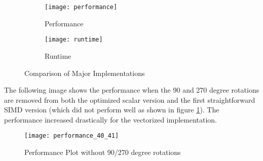 \begin{figure}[H]
  \begin{subfigure}[t]{\linewidth}
    \centering
    \texttt{[image: performance]}
    \caption{Performance}
    \label{fig:perf}
  \end{subfigure}
  \begin{subfigure}[t]{\linewidth}
    \centering
    \texttt{[image: runtime]}
    \caption{Runtime}
    \label{fig:runtime}
  \end{subfigure}
  \caption{Comparison of Major Implementations}
\end{figure}

The following image shows the performance when the 90 and 270 degree rotations
are removed from both the optimized scalar version and the first straightforward
SIMD version (which did not perform well as shown in figure \ref{fig:perf}). The
performance increased drastically for the vectorized implementation.

\begin{figure}[!ht]
  \centering
  \texttt{[image: performance\_40\_41]}
  \caption{Performance Plot without 90/270 degree rotations}
  \label{fig:perf_40_41}
\end{figure}







